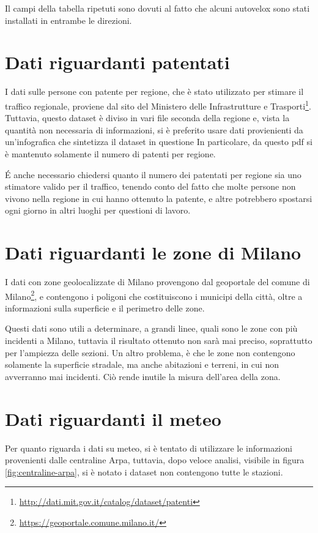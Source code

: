 \documentclass[a4paper]{report}
\begin{document}
Il campi della tabella ripetuti sono dovuti al fatto che alcuni autovelox sono stati 
installati in entrambe le direzioni.

\section{Dati riguardanti patentati}

I dati sulle persone con patente per regione, che è stato utilizzato per stimare il traffico 
regionale, proviene dal sito del Ministero delle Infrastrutture e 
Trasporti\footnote{\url{http://dati.mit.gov.it/catalog/dataset/patenti}}.
Tuttavia, questo dataset è diviso in vari file seconda della regione e, vista la quantità 
non necessaria di informazioni, si è preferito usare dati provienienti da un'infografica che 
sintetizza il dataset in questione \cite{INFOGRAFICA_MIT:1}
In particolare, da questo pdf si è mantenuto solamente il numero di patenti per regione.

\'E anche necessario chiedersi quanto il numero dei patentati per regione sia uno stimatore 
valido per il traffico, tenendo conto del fatto che molte persone non vivono nella regione 
in cui hanno ottenuto la patente, e altre potrebbero spostarsi ogni giorno in altri 
luoghi per questioni di lavoro.

\section{Dati riguardanti le zone di Milano}

I dati con zone geolocalizzate di Milano provengono dal geoportale del comune di 
Milano\footnote{\url{https://geoportale.comune.milano.it/}}, e contengono i poligoni che 
costituiscono i municipi della città, 
oltre a informazioni sulla superficie e il perimetro delle zone.

Questi dati sono utili a determinare, a grandi linee, quali sono le zone con più incidenti 
a Milano, tuttavia il risultato ottenuto non sarà mai preciso, 
soprattutto per l'ampiezza delle sezioni.
Un altro problema, è che le zone non contengono solamente la superficie stradale, ma anche 
abitazioni e terreni, in cui non avverranno mai incidenti. 
Ciò rende inutile la misura dell'area della zona.

\section{Dati riguardanti il meteo}

Per quanto riguarda i dati su meteo, si è tentato di utilizzare le informazioni provenienti dalle 
centraline Arpa, tuttavia, dopo veloce analisi, visibile in figura \ref{fig:centraline-arpa}, 
si è notato i dataset non contengono tutte le stazioni.
\end{document}
